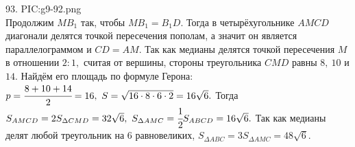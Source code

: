 93. {{PIC:g9-92.png}}\\
Продолжим $MB_1$ так, чтобы $MB_1=B_1D.$ Тогда в четырёхугольнике $AMCD$ диагонали делятся точкой пересечения пополам, а значит он является параллелограммом и $CD=AM.$ Так как медианы делятся точкой пересечения $M$ в отношении $2:1,$ считая от вершины, стороны треугольника $CMD$ равны $8,\ 10$ и $14.$ Найдём его площадь по формуле Герона: $p=\cfrac{8+10+14}{2}=16,\ S=\sqrt{16\cdot8\cdot6\cdot2}=16\sqrt{6}.$ Тогда $S_{AMCD}=2S_{\Delta CMD}=32\sqrt{6},\ S_{\Delta AMC}=\cfrac{1}{2}S_{ABCD}=16\sqrt{6}.$ Так как медианы делят любой треугольник на 6 равновеликих, $S_{\Delta ABC}=3S_{\Delta AMC}=48\sqrt{6}.$\newpage\noindent
